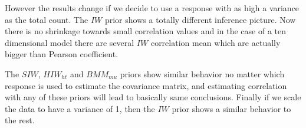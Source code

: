\documentclass[a4paper]{article}
\newcommand{\matt}[1]{\textcolor{red}{(matt: #1)}}
\begin{document}
However the results change if we decide to use a response with as high a variance as the total count. The $IW$ prior shows a totally different inference picture. Now there is no shrinkage towards small correlation values and in the case of a ten dimensional model there are several $IW$ correlation mean which are actually bigger than Pearson coefficient. 

The $SIW$, $HIW_{ht}$ and $BMM_{mu}$ priors show similar behavior no matter which response is used to estimate the covariance matrix, and estimating correlation with any of these priors will lead to basically same conclusions. Finally if we scale the data to have a variance of 1, then the $IW$ prior shows a similar behavior to the rest.

\end{document}
